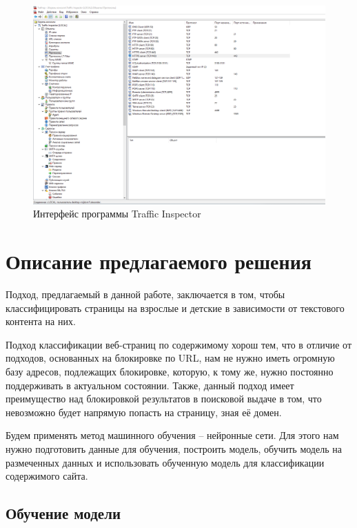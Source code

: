 \documentclass[14pt]{matmex-diploma}
\begin{document}
    \begin{figure}[h]
        \centering
    	\includegraphics[scale=0.4]{images/bad_interface.png}
    	\caption{Интерфейс программы Traffic Inspector}
    	\label{bad}
    \end{figure}

\section{Описание предлагаемого решения}

    Подход, предлагаемый в данной работе, заключается в том, чтобы классифицировать страницы на взрослые и детские в зависимости
    от текстового контента на них.
    
    Подход классификации веб-страниц по содержимому хорош тем, что в отличие от подходов, основанных на блокировке по URL,
    нам не нужно иметь огромную базу адресов, подлежащих блокировке, которую, к тому же, нужно постоянно поддерживать в актуальном
    состоянии. Также, данный подход имеет преимущество над блокировкой результатов в поисковой выдаче в том, что невозможно будет 
    напрямую попасть на страницу, зная её домен.
    
    Будем применять метод машинного обучения – нейронные сети. Для этого нам нужно
    подготовить данные для обучения, построить модель, обучить модель на размеченных данных и использовать 
    обученную модель для классификации содержимого сайта.
    
    \subsection{Обучение модели}
    
\end{document}
